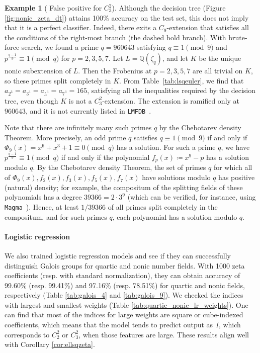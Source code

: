 \documentclass[letterpaper, 10pt]{article}
\newcommand{\1}{\mathds{1}}	%
\theoremstyle{definition}
\newtheorem{example}[theorem]{Example}
\theoremstyle{remark}
\begin{document}
\begin{example}[ False positive for $C_3^2$]
\label{ex:C3C3}
    Although the decision tree (Figure \ref{fig:nonic_zeta_dt}) attains 100\% accuracy on the test set, this does not imply that it is a perfect classifier. Indeed, there exits a $C_9$-extension that satisfies all the conditions of the right-most branch (the dashed bold branch).
    With brute-force search, we found a prime $q = 960643$ satisfying $q \equiv 1 \pmod{9}$ and $p^{\frac{q-1}{9}} \equiv 1 \pmod{q}$ for $p = 2, 3, 5, 7$.
    Let \( L = \mathbb{Q}(\zeta_q) \), and let \( K \) be the unique nonic subextension of \( L \).    Then the Frobenius at $p = 2, 3, 5, 7$ are all trivial on $K$, so these primes split completely in $K$. From Table~\ref{tab:lsqeuler}, we find that \( a_{2^3} = a_{3^3} = a_{5^3} = a_{7^3} = 165 \), satisfying all the inequalities required by the decision tree, even though \( K \) is not a \( C_3^2 \)-extension.
    The extension is ramified only at $960643$, and it is not currently listed in \texttt{LMFDB}~\cite{lmfdb}.
    
    Note that there are infinitely many such primes \( q \) by the Chebotarev density Theorem.   More precisely, an odd prime \( q \) satisfies \( q \equiv 1 \pmod{9} \) if and only if \( \Phi_9(x) = x^6 + x^3 + 1 \equiv 0 \pmod{q} \) has a solution.   For such a prime \( q \), we have \( p^{\frac{q - 1}{9}} \equiv 1 \pmod{q} \) if and only if the polynomial \( f_p(x) \coloneqq x^9 - p \) has a solution modulo \( q \).   By the Chebotarev density Theorem, the set of primes \( q \) for which all of \( \Phi_9(x), f_2(x), f_3(x), f_5(x), f_7(x) \) have solutions modulo \( q \) has positive (natural) density; for example, the compositum of the splitting fields of these polynomials has a degree $39366 = 2 \cdot 3^9$ (which can be verified, for instance, using \texttt{Magma}~\cite{magma}). Hence, at least $1 / 39366$ of all primes split completely in the compositum, and for such primes \(q\), each polynomial has a solution modulo \(q\).


\end{example}




\paragraph{Logistic regression}

We also trained logistic regression models and see if they can successfully distinguish Galois groups for quartic and nonic number fields.
With 1000 zeta coefficients (resp. with standard normalization), they can obtain accuracy of  99.60\% (resp. 99.41\%) and 97.16\% (resp. 78.51\%) for quartic and nonic fields, respectively (Table \ref{tab:galois_4} and \ref{tab:galois_9}).
We checked the indices with largest and smallest weights (Table \ref{tab:quartic_nonic_lr_weights}).
One can find that most of the indices for large weights are square or cube-indexed coefficients, which means that the model tends to predict output as \emph{1}, which corresponds to $C_2^2$ or $C_3^2$, when those features are large.
These results align well with Corollary \ref{cor:ellsqzeta}.
\end{document}
